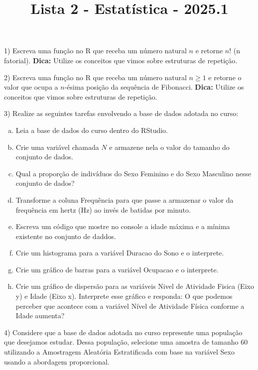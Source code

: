 \documentclass{article}
\title{Lista 2 - Estatística - 2025.1}
\begin{document}
\date{}
\maketitle

1) Escreva uma função no R que receba um número natural $n$ e retorne $n!$ (n fatorial). \textbf{Dica:} Utilize os conceitos que vimos sobre estruturas de repetição. 

\vspace{5px}

2) Escreva uma função no R que receba um número natural $n\geq 1$ e retorne o valor que ocupa a $n$-ésima posição da sequência de Fibonacci. 
\textbf{Dica:} Utilize os conceitos que vimos sobre estruturas de repetição. 

\vspace{5px}

3) Realize as seguintes tarefas envolvendo a base de dados adotada no curso:
\begin{enumerate}[a)]
    \item Leia a base de dados do curso dentro do RStudio. 
    \item Crie uma variável chamada $N$ e armazene nela o valor do tamanho do conjunto de dados.
    \item Qual a proporção de indivíduos do Sexo Feminino e do Sexo Masculino nesse conjunto de dados?
    \item Transforme a coluna Frequência para que passe a armazenar o valor da frequência em hertz (Hz) ao invés de batidas por minuto. 
    \item Escreva um código que mostre no console a idade máxima e a mínima existente no conjunto de daddos. 
    \item Crie um histograma para a variável Duracao do Sono e o interprete. 
    \item Crie um gráfico de barras para a variável Ocupacao e o interprete. 
    \item Crie um gráfico de dispersão para as variáveis Nivel de Atividade Fisica (Eixo y) e Idade (Eixo x). Interprete esse gráfico e responda: O que podemos perceber que acontece com a variável Nível de Atividade Física conforme a Idade aumenta? 
\end{enumerate}

\vspace{5px}

4) Considere que a base de dados adotada no curso represente uma população que desejamos estudar.
Dessa população, selecione uma amostra de tamanho $60$ utilizando a Amostragem Aleatória Estratificada com base na variável Sexo usando a abordagem proporcional. 
\end{document}
